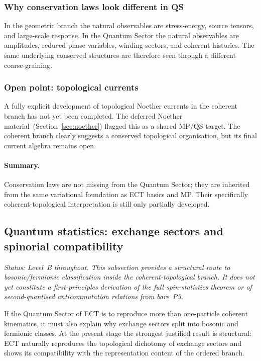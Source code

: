 \subsubsection*{Why conservation laws look different in QS}

In the geometric branch the natural observables are stress-energy,
source tensors, and large-scale response.
In the Quantum Sector the natural observables are amplitudes, reduced
phase variables, winding sectors, and coherent histories.
The same underlying conserved structures are therefore seen through a
different coarse-graining.

\subsubsection*{Open point: topological currents}

A fully explicit development of topological Noether currents in the
coherent branch has not yet been completed.
The deferred Noether material~(Section~\ref{sec:noether}) flagged this
as a shared MP/QS target.
The coherent branch clearly suggests a conserved topological
organisation, but its final current algebra remains open.

\paragraph{Summary.}
Conservation laws are not missing from the Quantum Sector; they are
inherited from the same variational foundation as ECT basics and MP.
Their specifically coherent-topological interpretation is still only
partially developed.

\subsection{Quantum statistics: exchange sectors and spinorial compatibility}
\label{sec:qs_statistics}

\textit{Status: Level~B throughout.
This subsection provides a structural route to bosonic/fermionic
classification inside the coherent-topological branch.
It does not yet constitute a first-principles derivation of the full
spin-statistics theorem or of second-quantised anticommutation
relations from bare~P3.}

\medskip
If the Quantum Sector of ECT is to reproduce more than one-particle
coherent kinematics, it must also explain why exchange sectors split
into bosonic and fermionic classes.
At the present stage the strongest justified result is structural: ECT
naturally reproduces the topological dichotomy of exchange sectors and
shows its compatibility with the representation content of the ordered
branch.

